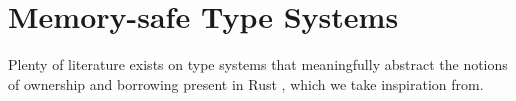 \documentclass{article}
\newcommand{\agap}{\hspace{0.25em}}
\newcommand{\mkref}{\textbf{ref}~}
\newcommand{\mutate}[3]{\textbf{mut}~ #1 \Rightarrow #2 ~\textbf{then}~ #3}
\newcommand{\mutptr}[3]{\textbf{mutAt}~ #1 \Rightarrow #2 ~\textbf{then}~ #3}
\newcommand{\drfPth}{\mathbf{*}}
\newcommand{\letvar}[3]{\textbf{let}~ #1 \Leftarrow #2 ~\textbf{then}~ #3}
\newcommand{\red}{\leadsto}
\newcommand{\judge}[3]{\textsc{#1}&\frac{#2}{#3}}
\begin{document}

\section{Memory-safe Type Systems}

Plenty of literature exists on type systems that meaningfully abstract the notions of ownership and borrowing present in Rust \cite{marshall2022entente, marshall2024fracunique}, which we take inspiration from. 
\end{document}
